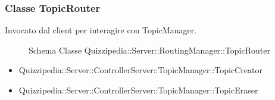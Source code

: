 \subsubsection{Classe TopicRouter}
Invocato dal client per interagire con TopicManager.
\begin{figure}[H]
\centering
\noindent{}
\caption[Schema Classe TopicRouter]{Schema Classe Quizzipedia::Server::RoutingManager::TopicRouter}
\end{figure}
\begin{itemize}
\item Quizzipedia::Server::ControllerServer::TopicManager::TopicCreator
\item Quizzipedia::Server::ControllerServer::TopicManager::TopicEraser
\end{itemize}
